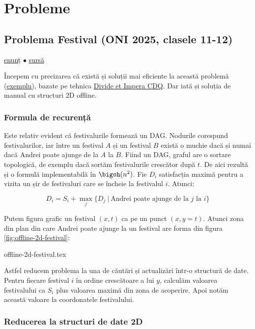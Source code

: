 \section{Probleme}

\subsection{Problema Festival (ONI 2025, clasele 11-12)}
\label{problem:festival}

\href{https://kilonova.ro/problems/3720}{enunț}
$\bullet$
\hyperref[code:festival]{sursă}

Începem cu precizarea că există și soluții mai eficiente la această problemă (\href{https://kilonova.ro/submissions/1161191}{exemplu}), bazate pe tehnica \href{https://robert1003.github.io/2020/01/31/cdq-divide-and-conquer.html}{Divide et Impera CDQ}. Dar iată și soluția de manual cu structuri 2D offline.

\subsubsection*{Formula de recurență}

Este relativ evident că festivalurile formează un DAG. Nodurile corespund festivalurilor, iar între un festival $A$ și un festival $B$ există o muchie dacă și numai dacă Andrei poate ajunge de la $A$ la $B$. Fiind un DAG, graful are o sortare topologică, de exemplu dacă sortăm festivalurile crescător după $t$. De aici rezultă și o formulă implementabilă în $\bigoh(n^2)$. Fie $D_i$ satisfacția maximă pentru a vizita un șir de festivaluri care se încheie la festivalul $i$. Atunci:

$$D_i = S_i + \max_{j} \{ D_j \ | \ \text{Andrei poate ajunge de la $j$ la $i$} \}$$

Putem figura grafic un festival $(x, t)$ ca pe un punct $(x, y=t)$. Atunci zona din plan din care Andrei poate ajunge la un festival are forma din figura \ref{fig:offline-2d-festival}:

{offline-2d-festival.tex}

Astfel reducem problema la una de căutări și actualizări într-o structură de date. Pentru fiecare festival $i$ în ordine crescătoare a lui $y$, calculăm valoarea festivalului ca $S_i$ plus valoarea maximă din zona de acoperire. Apoi notăm această valoare la coordonatele festivalului.

\subsubsection*{Reducerea la structuri de date 2D}

